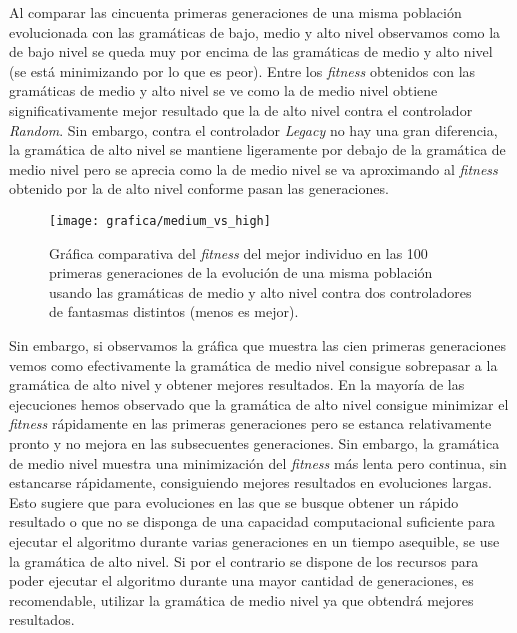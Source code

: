 Al comparar las cincuenta primeras generaciones de una misma población evolucionada con las gramáticas de bajo, medio y alto nivel observamos como la de bajo nivel se queda muy por encima de las gramáticas de medio y alto nivel (se está minimizando por lo que es peor). Entre los \textit{fitness} obtenidos con las gramáticas de medio y alto nivel se ve como la de medio nivel obtiene significativamente mejor resultado que la de alto nivel contra el controlador \textit{Random}. Sin embargo, contra el controlador \textit{Legacy} no hay una gran diferencia, la gramática de alto nivel se mantiene ligeramente por debajo de la gramática de medio nivel pero se aprecia como la de medio nivel se va aproximando al \textit{fitness} obtenido por la de alto nivel conforme pasan las generaciones.

\begin{figure}[H]
\centering
\texttt{[image: grafica/medium\_vs\_high]}
\label{grafica:comparacion-medium-vs-high}
\caption{Gráfica comparativa del \textit{fitness} del mejor individuo en las 100 primeras generaciones de la evolución de una misma población usando las gramáticas de medio y alto nivel contra dos controladores de fantasmas distintos (menos es mejor).}
\end{figure}

Sin embargo, si observamos la gráfica que muestra las cien primeras generaciones vemos como efectivamente la gramática de medio nivel consigue sobrepasar a la gramática de alto nivel y obtener mejores resultados. En la mayoría de las ejecuciones hemos observado que la gramática de alto nivel consigue minimizar el \textit{fitness} rápidamente en las primeras generaciones pero se estanca relativamente pronto y no mejora en las subsecuentes generaciones. Sin embargo, la gramática de medio nivel muestra una minimización del \textit{fitness} más lenta pero continua, sin estancarse rápidamente, consiguiendo mejores resultados en evoluciones largas. Esto sugiere que para evoluciones en las que se busque obtener un rápido resultado o que no se disponga de una capacidad computacional suficiente para ejecutar el algoritmo durante varias generaciones en un tiempo asequible, se use la gramática de alto nivel. Si por el contrario se dispone de los recursos para poder ejecutar el algoritmo durante una mayor cantidad de generaciones, es recomendable, utilizar la gramática de medio nivel ya que obtendrá mejores resultados.